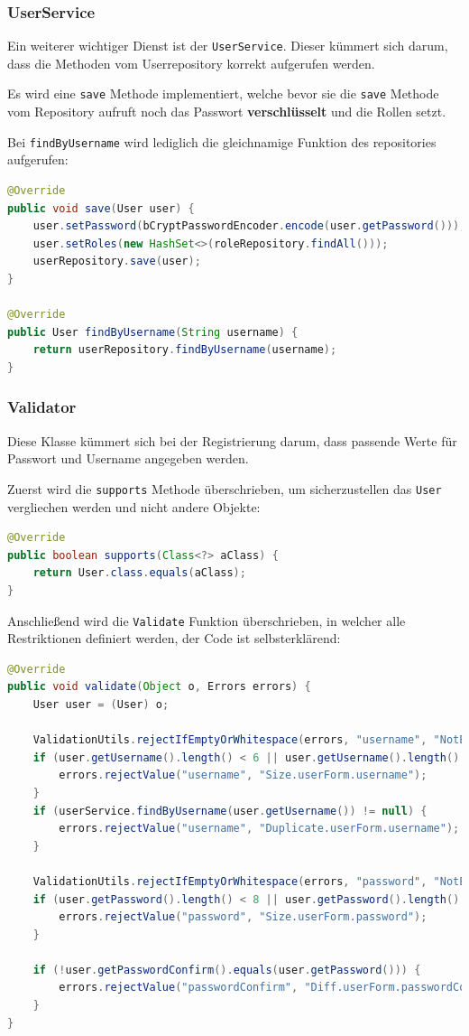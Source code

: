 \subsubsection{UserService}
Ein weiterer wichtiger Dienst ist der \verb|UserService|. Dieser kümmert sich darum, dass die Methoden vom Userrepository korrekt aufgerufen werden. 

Es wird eine \verb|save| Methode implementiert, welche bevor sie die \verb|save| Methode vom Repository aufruft noch das Passwort \textbf{verschlüsselt} und die Rollen setzt.

Bei \verb|findByUsername| wird lediglich die gleichnamige Funktion des repositories aufgerufen:

\begin{lstlisting}[language=Java]
@Override
public void save(User user) {
	user.setPassword(bCryptPasswordEncoder.encode(user.getPassword()));
	user.setRoles(new HashSet<>(roleRepository.findAll()));
	userRepository.save(user);
}

@Override
public User findByUsername(String username) {
	return userRepository.findByUsername(username);
}
\end{lstlisting}

\subsubsection{Validator}
Diese Klasse kümmert sich bei der Registrierung darum, dass passende Werte für Passwort und Username angegeben werden.

Zuerst wird die \verb|supports| Methode überschrieben, um sicherzustellen das \verb|User| vergliechen werden und nicht andere Objekte:
\begin{lstlisting}[language=Java]
@Override
public boolean supports(Class<?> aClass) {
	return User.class.equals(aClass);
}
\end{lstlisting}

Anschließend wird die \verb|Validate| Funktion überschrieben, in welcher alle Restriktionen definiert werden, der Code ist selbsterklärend:

\begin{lstlisting}[language=Java]
@Override
public void validate(Object o, Errors errors) {
	User user = (User) o;
	
	ValidationUtils.rejectIfEmptyOrWhitespace(errors, "username", "NotEmpty");
	if (user.getUsername().length() < 6 || user.getUsername().length() > 32) {
		errors.rejectValue("username", "Size.userForm.username");
	}
	if (userService.findByUsername(user.getUsername()) != null) {
		errors.rejectValue("username", "Duplicate.userForm.username");
	}
	
	ValidationUtils.rejectIfEmptyOrWhitespace(errors, "password", "NotEmpty");
	if (user.getPassword().length() < 8 || user.getPassword().length() > 32) {
		errors.rejectValue("password", "Size.userForm.password");
	}
	
	if (!user.getPasswordConfirm().equals(user.getPassword())) {
		errors.rejectValue("passwordConfirm", "Diff.userForm.passwordConfirm");
	}
}
	\end{lstlisting}
	
